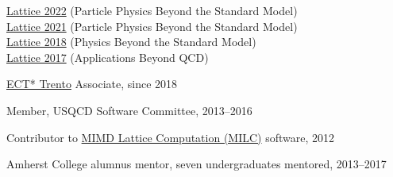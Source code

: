 \documentclass[10 pt]{article}
\renewcommand{\section}[2]%
    {\pagebreak[2]\vspace{1.3\baselineskip}%
     \hspace{0in}%
     \marginpar{
     \raggedright \scshape #1}#2}
\newenvironment{tightlist}
  {\begin{list} {} {\setlength{\topsep}{-8 pt} \setlength{\itemsep}{-3 pt} \setlength{\leftmargin}{0 mm}}}{\end{list}}
\newcommand{\blankline}{\quad\pagebreak[2]}
\newcommand{\spacer}{\blankline\vspace{12 pt}\blankline}
\begin{document}
\begin{tightlist}
    \qquad \href{https://indico.hiskp.uni-bonn.de/event/40/}{Lattice 2022} (Particle Physics Beyond the Standard Model) \\
    \qquad \href{https://indico.cern.ch/event/1006302/}{Lattice 2021} (Particle Physics Beyond the Standard Model)      \\
    \qquad \href{https://indico.fnal.gov/event/15949/}{Lattice 2018} (Physics Beyond the Standard Model)                \\
    \qquad \href{http://wpd.ugr.es/~lattice2017/}{Lattice 2017} (Applications Beyond QCD)
  \item \href{http://www.ectstar.eu}{ECT* Trento} Associate, since 2018 %
  \item Member, USQCD Software Committee, 2013--2016
  \item Contributor to \href{https://github.com/milc-qcd/milc_qcd/}{MIMD Lattice Computation (MILC)} software, 2012
  \item Amherst College alumnus mentor, seven undergraduates mentored, 2013--2017 %
\end{tightlist}

\spacer



\begin{comment}
\section{Research} %

\vspace{-12 pt} %
\begin{tightlist}
  \item \textbf{Applications of computing to particle physics}
  \item ---Investigations of strongly interacting quantum field theories using lattice gauge theory
  \item ---Non-perturbative lattice studies of supersymmetric field theories
  \item ---Testing models of dynamical electroweak symmetry breaking and composite dark matter
  \item ---Quantum simulation of real-time dynamics in simple quantum systems
\end{tightlist}

\spacer
\end{comment}
\end{document}
